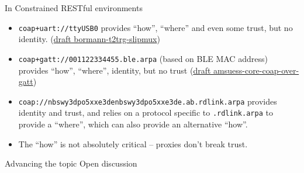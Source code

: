 \documentclass[aspectratio=169,colorlinks]{beamer}
\newcommand{\ietfdraft}[1]{\href{https://datatracker.ietf.org/doc/draft-#1/}{draft #1}}
\begin{document}
\begin{frame}{In Constrained RESTful environments}\Large
  \begin{itemize}
    \item \texttt{coap+uart://ttyUSB0} provides ``how'', ``where'' and even some trust, but no identity. (\ietfdraft{bormann-t2trg-slipmux})
    \item \texttt{coap+gatt://001122334455.ble.arpa} (based on BLE MAC address) provides ``how'', ``where'', identity, but no trust (\ietfdraft{amsuess-core-coap-over-gatt})
    \item \texttt{coap://nbswy3dpo5xxe3denbswy3dpo5xxe3de.ab.rdlink.arpa} provides identity and trust, and relies on a protocol specific to \texttt{.rdlink.arpa} to provide a ``where'', which can also provide an alternative ``how''.
    \item The ``how'' is not absolutely critical -- proxies don't break trust.
  \end{itemize}
\end{frame}

\begin{frame}{Advancing the topic}\Large
  Open discussion
\end{frame}
\end{document}
